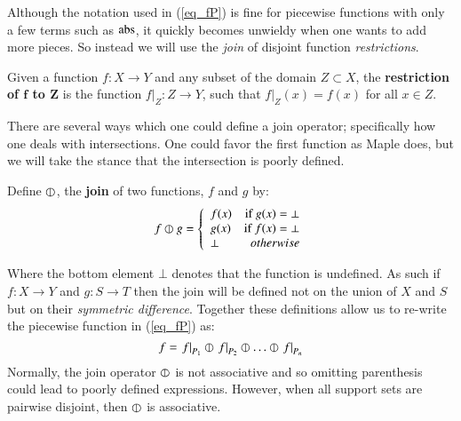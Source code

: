 Although the notation used in (\ref{eq_fP}) is fine for piecewise functions with only a few terms such as $\text{abs}$,
it quickly becomes unwieldy when one wants to add more pieces.
So instead we will use the \emph{join} of disjoint function \emph{restrictions}.
\begin{definition}
	Given a function $f:X \to Y$ and any subset of the domain $Z \subset X$, 
	the \textbf{restriction of $\boldsymbol{f}$ to $\boldsymbol{Z}$} is the function $f|_Z : Z \to Y$, 
	such that $f|_Z(x) = f(x)$ for all $x \in Z$.
\end{definition}


There are several ways which one could define a join operator; specifically how one deals with intersections.
One could favor the first function as Maple does, but we will take the stance that the intersection is poorly defined.
\begin{definition}
	Define $\varobar$, the \textbf{join} of two functions, $f$ and $g$ by:
	\begin{equation}
	\label{def:fjoin}
		f \varobar g =  
		\left\{
	     		\begin{array}{lr}
	       		f(x) & \text{if } g(x) = \bot \\
	       		g(x) & \text{if } f(x) = \bot \\
	       		\bot & otherwise
	     		\end{array}
	   	\right.
	\end{equation}
\end{definition}
Where the bottom element $\bot$ denotes that the function is undefined.
As such if $f:X \to Y$ and $g:S \to T$ then the join will be defined not on the union of $X$ and $S$ but on their 
\emph{symmetric difference}.
Together these definitions allow us to re-write the piecewise function in (\ref{eq_fP}) as:
\begin{equation*}
	f = \left.f\right|_{P_1} \varobar \left.f\right|_{P_2} \varobar \ldots \varobar \left.f\right|_{P_n}
\end{equation*}
Normally, the join operator $\varobar$ is not associative and so omitting parenthesis could lead to poorly defined expressions.
However, when all support sets are pairwise disjoint, then $\varobar$ is associative.


